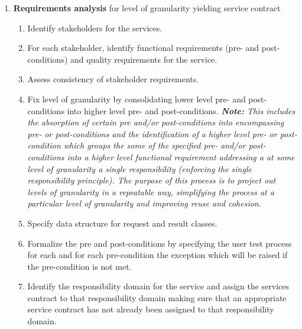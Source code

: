 \begin{enumerate}
 \item {\bf Requirements analysis} for level of granularity yielding service contract
  \begin{enumerate}
    \item Identify stakeholders for the services.
    \item For each stakeholder, identify functional requirements (pre- and post-conditions) and quality requirements for the service.
    \item Assess consistency of stakeholder requirements.
    \item Fix level of granularity by consolidating lower level pre- and post-conditions into higher level pre- and post-conditions. 
	  \emph{\textbf{\textit{Note:}} This includes the absorption of certain pre and/or post-conditions into encompassing pre- or post-conditions and the identification of a higher level pre- or post-condition which groups the some of the specified pre- and/or post-conditions into a higher level functional requirement addressing a at some level of granularity a single responsibility (enforcing the single responsibility principle). The purpose of this process is to project out levels of granularity in a repeatable way, simplifying the process at a particular level of granularity and improving reuse and cohesion.}
    \item Specify data structure for request and result classes.
    \item Formalize the pre and post-conditions by specifying the user test process for each and for each pre-condition the exception which will be raised if the pre-condition is not met.
    \item Identify the responsibility domain for the service and assign the services contract to that responsibility domain making sure that an appropriate service contract has not already been assigned to that responsibility domain. 
  \end{enumerate}


\end{enumerate}
